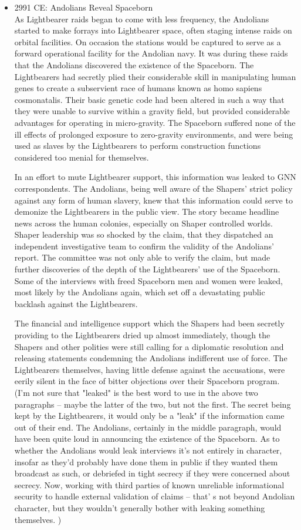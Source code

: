 \begin{itemize}
\item 2991 CE: Andolians Reveal Spaceborn \\

As Lightbearer raids began to come with less frequency, the Andolians
started to make forrays into Lightbearer space, often staging intense
raids on orbital facilities.  On occasion the stations would be
captured to serve as a forward operational facility for the Andolian
navy.  It was during these raids that the Andolians discovered the
existence of the Spaceborn.  The Lightbearers had secretly plied their
considerable skill in manipulating human genes to create a subservient
race of humans known as homo sapiens cosmonatalis.  Their basic
genetic code had been altered in such a way that they were unable to
survive within a gravity field, but provided considerable advantages
for operating in micro-gravity.  The Spaceborn suffered none of the
ill effects of prolonged exposure to zero-gravity environments, and
were being used as slaves by the Lightbearers to perform construction
functions considered too menial for themselves.

In an effort to mute Lightbearer support, this information was leaked
to GNN correspondents.  The Andolians, being well aware of the
Shapers' strict policy against any form of human slavery, knew that
this information could serve to demonize the Lightbearers in the
public view.  The story became headline news across the human
colonies, especially on Shaper controlled worlds.  Shaper leadership
was so shocked by the claim, that they dispatched an independent
investigative team to confirm the validity of the Andolians' report.
The committee was not only able to verify the claim, but made further
discoveries of the depth of the Lightbearers' use of the Spaceborn.
Some of the interviews with freed Spaceborn men and women were leaked,
most likely by the Andolians again, which set off a devastating public
backlash against the Lightbearers.

The financial and intelligence support which the Shapers had been
secretly providing to the Lightbearers dried up almost immediately,
though the Shapers and other polities were still calling for a
diplomatic resolution and releasing statements condemning the
Andolians indifferent use of force.  The Lightbearers themselves,
having little defense against the accusations, were eerily silent in
the face of bitter objections over their Spaceborn program. (I'm not
sure that "leaked" is the best word to use in the above two
paragraphs -- maybe the latter of the two, but not the first. The
secret being kept by the Lightbearers, it would only be a "leak" if
the information came out of their end. The Andolians, certainly in the
middle paragraph, would have been quite loud in announcing the
existence of the Spaceborn. As to whether the Andolians would leak
interviews it's not entirely in character, insofar as they'd
probably have done them in public if they wanted them broadcast as
such, or debriefed in tight secrecy if they were concerned about
secrecy. Now, working with third parties of known unreliable
informational security to handle external validation of claims -- that'
s not beyond Andolian character, but they wouldn't generally bother
with leaking something themselves. )


\end{itemize}
